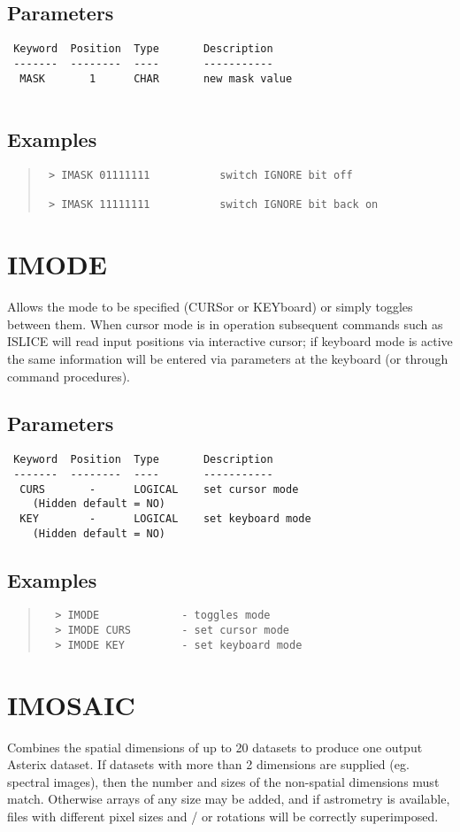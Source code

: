 \documentclass{book}
\renewcommand{\_}{{\tt\char'137}}     %
\begin{document}
\subsection{Parameters}
\begin{verbatim}
 Keyword  Position  Type       Description
 -------  --------  ----       -----------
  MASK       1      CHAR       new mask value
 
\end{verbatim}\subsection{Examples}
\begin{quote}\begin{verbatim}
 > IMASK 01111111           switch IGNORE bit off
 
 > IMASK 11111111           switch IGNORE bit back on
 \end{verbatim}\end{quote}
\section{IMODE}
Allows the mode to be specified (CURSor or KEYboard) or simply
toggles between them. When cursor mode is in operation subsequent
commands such as ISLICE will read input positions via interactive
cursor; if keyboard mode is active the same information will be
entered via parameters at the keyboard (or through command procedures).
\subsection{Parameters}
\begin{verbatim}
 Keyword  Position  Type       Description
 -------  --------  ----       -----------
  CURS       -      LOGICAL    set cursor mode
    (Hidden default = NO)
  KEY        -      LOGICAL    set keyboard mode
    (Hidden default = NO)
\end{verbatim}\subsection{Examples}
\begin{quote}\begin{verbatim}
  > IMODE             - toggles mode
  > IMODE CURS        - set cursor mode
  > IMODE KEY         - set keyboard mode
 \end{verbatim}\end{quote}
\section{IMOSAIC}
Combines the spatial dimensions of up to 20 datasets to produce one
output Asterix dataset. If datasets with more than 2 dimensions are
supplied (eg. spectral images), then the number and sizes of the
non-spatial dimensions must match. Otherwise arrays of any size may
be added, and if astrometry is available, files with different
pixel sizes and / or rotations will be correctly superimposed.
 
\end{document}
